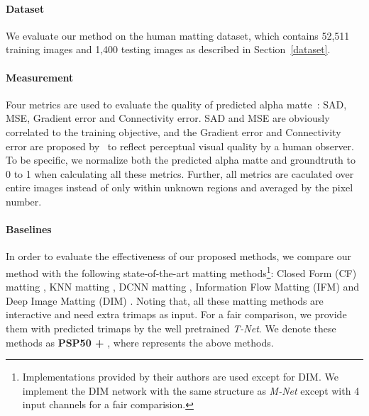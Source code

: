\paragraph{\textbf{Dataset}}

We evaluate our method on the human matting dataset, which contains 52,511 training images and 1,400 testing images as described in Section~\ref{dataset}.


\paragraph{\textbf{Measurement}}

Four metrics are used to evaluate the quality of predicted alpha matte~\cite{rhemann2009perceptually}: SAD, MSE, Gradient error and Connectivity error.
SAD and MSE are obviously correlated to the training objective, and the Gradient  error and Connectivity error are proposed by~\cite{rhemann2009perceptually} to reflect perceptual visual quality by a human observer.
To be specific, we normalize both the predicted alpha matte and groundtruth to 0 to 1 when calculating all these metrics.
Further, all metrics are caculated over entire images instead of only within unknown regions and averaged by the pixel number.

\begin{comment}

where  and  are the predicted alpha matte and ground truth alpha matte respectively. K is the number of pixels in alpha matte.  and ||.|| are functions and distance types used to calculate the corresponding matte errors.
\end{comment}

\paragraph{\textbf{Baselines}}
In order to evaluate the effectiveness of our proposed methods, we compare our method with the following state-of-the-art matting methods\footnote{Implementations provided by their authors are used except for DIM. We implement the DIM network with the same structure as \emph{M-Net} except with 4 input channels for a fair comparision.}:
Closed Form (CF) matting \cite{levin2008closed} , KNN matting \cite{chen2013knn}, DCNN matting \cite{cho2016natural} , Information Flow Matting (IFM) \cite{aksoy2017designing} and Deep Image Matting (DIM) \cite{xu2017deep}.
Noting that, all these matting methods are interactive and need extra trimaps as input.
For a fair comparison, we provide them with predicted trimaps by the well pretrained \emph{T-Net}.
We denote these methods as \textbf{PSP50 + }, where  represents the above methods.

